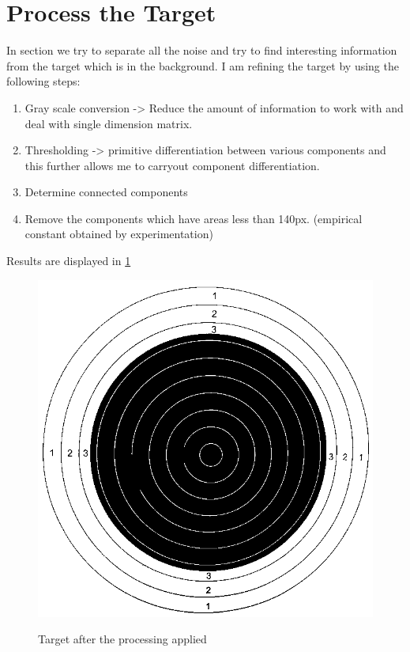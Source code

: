 \documentclass[10pt,twocolumn,letterpaper]{article}
\begin{document}
\section{Process the Target}
In section we try to separate all the noise and try to find interesting information from the target which is in the background. I am refining the target by using the following steps:
\begin{enumerate}
	\item Gray scale conversion -> Reduce the amount of information to work with and deal with single dimension matrix.
	\item Thresholding -> primitive differentiation between various components and this further allows me to carryout component differentiation.
	\item Determine connected components
	\item Remove the components which have areas less than 140px. (empirical constant obtained by experimentation)
\end{enumerate}
Results are displayed in \ref{TargetPreProcessing}
\begin{figure}[h]
	\centering
	\includegraphics[width=\linewidth]{PreProcessedImage}
	\label{TargetPreProcessing}
	\caption{Target after the processing applied}
\end{figure}
\end{document}
